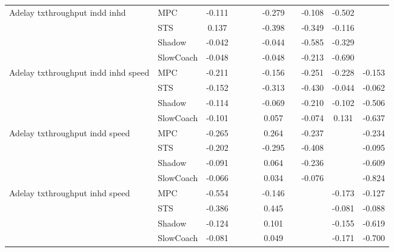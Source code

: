 \begin{tabular}{|l|l|*{9}{c|}}
\midrule
Adelay txthroughput indd inhd    & MPC &   -0.111 &        &        &     & -0.279 &     &  -0.108 &  -0.502 &       \\
                              & STS &    0.137 &        &        &     & -0.398 &     &  -0.349 &  -0.116 &       \\
                              & Shadow &   -0.042 &        &        &     & -0.044 &     &  -0.585 &  -0.329 &       \\
                              & SlowCoach &   -0.048 &        &        &     & -0.048 &     &  -0.213 &  -0.690 &       \\
\midrule
Adelay txthroughput indd inhd speed    & MPC &   -0.211 &        &        &     & -0.156 &     &  -0.251 &  -0.228 &   -0.153 \\
                              & STS &   -0.152 &        &        &     & -0.313 &     &  -0.430 &  -0.044 &   -0.062 \\
                              & Shadow &   -0.114 &        &        &     & -0.069 &     &  -0.210 &  -0.102 &   -0.506 \\
                              & SlowCoach &   -0.101 &        &        &     &  0.057 &     &  -0.074 &   0.131 &   -0.637 \\
\midrule
Adelay txthroughput indd speed    & MPC &   -0.265 &        &        &     &  0.264 &     &  -0.237 &      &   -0.234 \\
                              & STS &   -0.202 &        &        &     & -0.295 &     &  -0.408 &      &   -0.095 \\
                              & Shadow &   -0.091 &        &        &     &  0.064 &     &  -0.236 &      &   -0.609 \\
                              & SlowCoach &   -0.066 &        &        &     &  0.034 &     &  -0.076 &      &   -0.824 \\
\midrule
Adelay txthroughput inhd speed    & MPC &   -0.554 &        &        &     & -0.146 &     &      &  -0.173 &   -0.127 \\
                              & STS &   -0.386 &        &        &     &  0.445 &     &      &  -0.081 &   -0.088 \\
                              & Shadow &   -0.124 &        &        &     &  0.101 &     &      &  -0.155 &   -0.619 \\
                              & SlowCoach &   -0.081 &        &        &     &  0.049 &     &      &  -0.171 &   -0.700 \\

\end{tabular}
